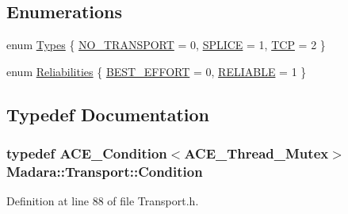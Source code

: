 \subsection*{Enumerations}
\begin{DoxyCompactItemize}
\item 
enum \hyperlink{namespaceMadara_1_1Transport_a280656de18d1bbe4a165cd9fdd654ba5}{Types} \{ \hyperlink{namespaceMadara_1_1Transport_a280656de18d1bbe4a165cd9fdd654ba5a70c51f2527432fc6d626c39d9019097d}{NO\_\-TRANSPORT} =  0, 
\hyperlink{namespaceMadara_1_1Transport_a280656de18d1bbe4a165cd9fdd654ba5aebef9e50b4444c512a871c759fe18757}{SPLICE} =  1, 
\hyperlink{namespaceMadara_1_1Transport_a280656de18d1bbe4a165cd9fdd654ba5a423f39bf6e79c7ebf7279c2268f19273}{TCP} =  2
 \}
\item 
enum \hyperlink{namespaceMadara_1_1Transport_a8eede09c44edca44b766fa0ace76aba3}{Reliabilities} \{ \hyperlink{namespaceMadara_1_1Transport_a8eede09c44edca44b766fa0ace76aba3a3278c1d2833224516cbf27185c32df53}{BEST\_\-EFFORT} =  0, 
\hyperlink{namespaceMadara_1_1Transport_a8eede09c44edca44b766fa0ace76aba3a7e04dbb87629114207ef526ea07fec82}{RELIABLE} =  1
 \}
\end{DoxyCompactItemize}


\subsection{Typedef Documentation}
\hypertarget{namespaceMadara_1_1Transport_a5dd6d9a7fb47cdbf2d1448242da4e13d}{
\subsubsection[{Condition}]{\setlength{\rightskip}{0pt plus 5cm}typedef ACE\_\-Condition$<$ACE\_\-Thread\_\-Mutex$>$ {\bf Madara::Transport::Condition}}}
\label{dd/deb/namespaceMadara_1_1Transport_a5dd6d9a7fb47cdbf2d1448242da4e13d}


Definition at line 88 of file Transport.h.



